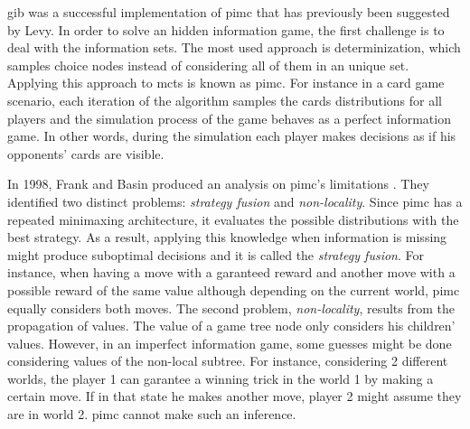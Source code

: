 \gls{gib} was a successful implementation of \gls{pimc} that has previously been suggested by Levy. 
In order to solve an hidden information game, the first challenge is to deal with the information sets.
The most used approach is determinization, which samples choice nodes instead of considering all of them in an unique set.
Applying this approach to \gls{mcts} is known as \gls{pimc}.
For instance in a card game scenario, each iteration of the algorithm samples the cards distributions for all players and the simulation process of the game behaves as a perfect information game.
In other words, during the simulation each player makes decisions as if his opponents' cards are visible.


In 1998, Frank and Basin produced an analysis on \gls{pimc}'s limitations \cite{Frank1998}.
They identified two distinct problems: \emph{strategy fusion} and \emph{non-locality}.
Since \gls{pimc} has a repeated minimaxing architecture, it evaluates the possible distributions with the best strategy.
As a result, applying this knowledge when information is missing might produce suboptimal decisions and it is called the \emph{strategy fusion}.
For instance, when having a move with a garanteed reward and another move with a possible reward of the same value although depending on the current world, \gls{pimc} equally considers both moves.
The second problem, \emph{non-locality}, results from the propagation of values.
The value of a game tree node only considers his children' values.
However, in an imperfect information game, some guesses might be done considering values of the non-local subtree.
For instance, considering 2 different worlds, the player 1 can garantee a winning trick in the world 1 by making a certain move.
If in that state he makes another move, player 2 might assume they are in world 2.
\gls{pimc} cannot make such an inference.


